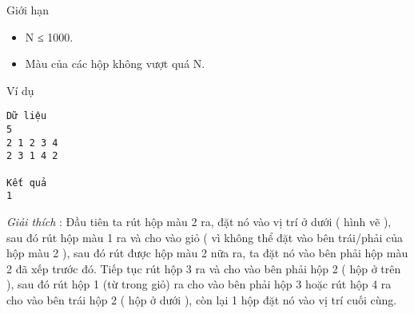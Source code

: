 Giới hạn  
\begin{itemize}
	\item     N ≤ 1000.   
	\item     Màu của các hộp không vượt quá N.   
\end{itemize}
   Ví dụ  
\begin{verbatim}
Dữ liệu
5
2 1 2 3 4
2 3 1 4 2

Kết quả
1
\end{verbatim}

\textit{    Giải thích   }   : Đầu tiên ta rút hộp màu 2 ra, đặt nó vào vị   trí ở dưới ( hình vẽ ), sau đó rút hộp màu 1 ra và cho vào giỏ ( vì không thể đặt vào bên trái/phải của hộp màu 2 ), sau đó rút được hộp màu 2 nữa ra, ta đặt nó vào bên phải hộp màu 2 đã xếp trước đó. Tiếp tục rút hộp 3 ra và cho vào bên phải hộp 2 ( hộp ở trên ), sau đó rút hộp 1 (từ trong giỏ) ra cho vào bên phải hộp 3 hoặc rút hộp 4 ra cho vào bên trái hộp 2 ( hộp ở dưới ), còn lại 1 hộp đặt nó vào vị trí cuối cùng.